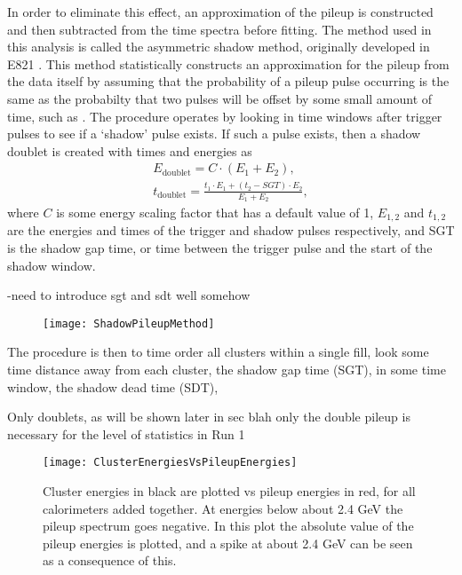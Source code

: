 In order to eliminate this effect, an approximation of the pileup is constructed and then subtracted from the time spectra before fitting. The method used in this analysis is called the asymmetric shadow method, originally developed in E821 \cite{E821PileupShadow}. This method statistically constructs an approximation for the pileup from the data itself by assuming that the probability of a pileup pulse occurring is the same as the probabilty that two pulses will be offset by some small amount of time, such as . The procedure operates by looking in time windows after trigger pulses to see if a `shadow' pulse exists. If such a pulse exists, then a shadow doublet is created with times and energies as 
            \begin{gather}
                E_{\text{doublet}} = C \cdot (E_{1} + E_{2}), \\
                t_{\text{doublet}} = \frac{t_{1} \cdot E_{1} + (t_{2}-SGT) \cdot E_{2}}{E_{1} + E_{2}},
            \end{gather}
where $C$ is some energy scaling factor that has a default value of 1, $E_{1,2}$ and $t_{1,2}$ are the energies and times of the trigger and shadow pulses respectively, and SGT is the shadow gap time, or time between the trigger pulse and the start of the shadow window.


-need to introduce sgt and sdt well somehow


\begin{figure}[]
    \centering
    \texttt{[image: ShadowPileupMethod]}
    \caption[Shadow pileup method]{}
    \label{fig:ShadowPileupMethod}
\end{figure}




The procedure is then to time order all clusters within a single fill, look some time distance away from each cluster, the shadow gap time (SGT), in some time window, the shadow dead time (SDT), 









Only doublets, as will be shown later in sec blah only the double pileup is necessary for the level of statistics in Run 1




    \begin{figure}[]
        \centering
        \texttt{[image: ClusterEnergiesVsPileupEnergies]}
        \caption[ClusterEnergiesVsPileupEnergies]{Cluster energies in black are plotted vs pileup energies in red, for all calorimeters added together. At energies below about 2.4 GeV the pileup spectrum goes negative. In this plot the absolute value of the pileup energies is plotted, and a spike at about 2.4 GeV can be seen as a consequence of this.}    
        \label{fig:ClusterEnergiesVsPileupEnergies}
    \end{figure}

